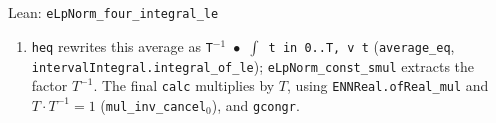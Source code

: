 \documentclass[11pt,a4paper]{article}
\begin{document}
\begin{leanbox}{Lean: \texttt{eLpNorm\_\allowbreak{}four\_\allowbreak{}integral\_\allowbreak{}le}}
\begin{enumerate}
\item \texttt{heq} rewrites this average as \texttt{T\ensuremath{{}^{-1}} \ensuremath{\bullet} \ensuremath{\int} t in 0.\allowbreak{}.\allowbreak{}T, v t} (\texttt{average\_\allowbreak{}eq}, \texttt{interval\allowbreak{}Integral.\allowbreak{}integral\_\allowbreak{}of\_\allowbreak{}le}); \texttt{e\allowbreak{}Lp\allowbreak{}Norm\_\allowbreak{}const\_\allowbreak{}smul} extracts the factor \(T^{-1}\). The final \texttt{calc} multiplies by \(T\), using \texttt{ENNReal.\allowbreak{}of\allowbreak{}Real\_\allowbreak{}mul} and \(T\cdot T^{-1}=1\) (\texttt{mul\_\allowbreak{}inv\_\allowbreak{}cancel\ensuremath{{}_{0}}}), and \texttt{gcongr}.

\end{enumerate}
\end{leanbox}
\end{document}
